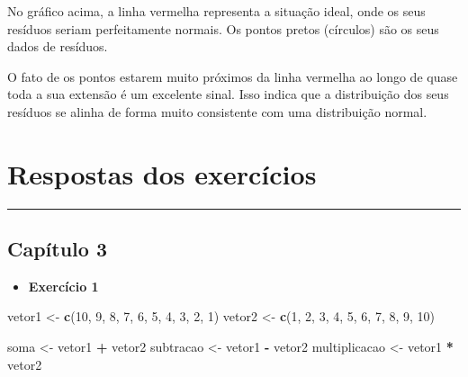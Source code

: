 \documentclass[
]{book}
\newenvironment{Shaded}{\begin{snugshade}}{\end{snugshade}}
\newcommand{\DecValTok}[1]{\textcolor[rgb]{0.00,0.00,0.81}{#1}}
\newcommand{\FunctionTok}[1]{\textcolor[rgb]{0.13,0.29,0.53}{\textbf{#1}}}
\newcommand{\NormalTok}[1]{#1}
\newcommand{\OtherTok}[1]{\textcolor[rgb]{0.56,0.35,0.01}{#1}}
\newcommand{\SpecialCharTok}[1]{\textcolor[rgb]{0.81,0.36,0.00}{\textbf{#1}}}
\providecommand{\tightlist}{%
  \setlength{\itemsep}{0pt}\setlength{\parskip}{0pt}}
\begin{document}
No gráfico acima, a linha vermelha representa a situação ideal, onde os seus resíduos seriam perfeitamente normais. Os pontos pretos (círculos) são os seus dados de resíduos.

O fato de os pontos estarem muito próximos da linha vermelha ao longo de quase toda a sua extensão é um excelente sinal. Isso indica que a distribuição dos seus resíduos se alinha de forma muito consistente com uma distribuição normal.

\chapter{Respostas dos exercícios}\label{respostas-dos-exercuxedcios}

\begin{center}\rule{0.5\linewidth}{0.5pt}\end{center}

\section{Capítulo 3}\label{capuxedtulo-3}

\begin{itemize}
\tightlist
\item
  \textbf{Exercício 1}
\end{itemize}

\begin{Shaded}
\begin{Highlighting}[]
\NormalTok{vetor1 }\OtherTok{\textless{}{-}} \FunctionTok{c}\NormalTok{(}\DecValTok{10}\NormalTok{, }\DecValTok{9}\NormalTok{, }\DecValTok{8}\NormalTok{, }\DecValTok{7}\NormalTok{, }\DecValTok{6}\NormalTok{, }\DecValTok{5}\NormalTok{, }\DecValTok{4}\NormalTok{, }\DecValTok{3}\NormalTok{, }\DecValTok{2}\NormalTok{, }\DecValTok{1}\NormalTok{)}
\NormalTok{vetor2 }\OtherTok{\textless{}{-}} \FunctionTok{c}\NormalTok{(}\DecValTok{1}\NormalTok{, }\DecValTok{2}\NormalTok{, }\DecValTok{3}\NormalTok{, }\DecValTok{4}\NormalTok{, }\DecValTok{5}\NormalTok{, }\DecValTok{6}\NormalTok{, }\DecValTok{7}\NormalTok{, }\DecValTok{8}\NormalTok{, }\DecValTok{9}\NormalTok{, }\DecValTok{10}\NormalTok{)}

\NormalTok{soma }\OtherTok{\textless{}{-}}\NormalTok{ vetor1 }\SpecialCharTok{+}\NormalTok{ vetor2}
\NormalTok{subtracao }\OtherTok{\textless{}{-}}\NormalTok{ vetor1 }\SpecialCharTok{{-}}\NormalTok{ vetor2}
\NormalTok{multiplicacao }\OtherTok{\textless{}{-}}\NormalTok{ vetor1 }\SpecialCharTok{*}\NormalTok{ vetor2}
\end{Highlighting}
\end{Shaded}
\end{document}
